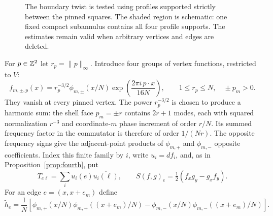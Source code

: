 \begin{figure}[htbp]
\centering
{}
\caption{The boundary twist is tested using profiles supported strictly
between the pinned squares.  The shaded region is schematic: one fixed
compact subannulus contains all four profile supports.  The estimates
remain valid when arbitrary vertices and edges are deleted.}
\label{fig:annulus-tests}
\end{figure}

For $p\in\mathbb Z^2$ let $r_p=\|p\|_\infty$.  Introduce four groups of
vertex functions, restricted to $V$:
\begin{equation}\label{eq:annulus-modes}
 f_{m,\pm,p}(x)
 =r_p^{-3/2}\phi_{m,\pm}(x/N)
       \exp\left(\frac{2\pi i\,p\cdot x}{16N}\right),
 \qquad
 1\leq r_p\leq N,\quad \pm p_m>0.
\end{equation}
They vanish at every pinned vertex.  The power $r_p^{-3/2}$ is chosen
to produce a harmonic sum: the shell face $p_m=\pm r$ contains $2r+1$ modes, each with
squared normalization $r^{-3}$ and coordinate-$m$ phase increment of order
$r/N$.  Its summed frequency factor in the commutator is therefore of
order $1/(Nr)$.  The opposite frequency signs give the adjacent-point
products of $\phi_{m,+}$ and $\phi_{m,-}$ opposite coefficients.
Index this finite family by $i$, write $u_i=df_i$, and, as in
Proposition~\ref{prop:fourth}, put
\[
 T_{e\ell}=\sum_i u_i(e)\overline{u_i(\ell)},
 \qquad
 S(f,g)_e=\tfrac12(f_xg_y-g_xf_y).
\]
For an edge $e=(x,x+e_m)$ define
\begin{equation}\label{eq:annulus-htilde}
 \widetilde h_e=\frac1N
 \left[
 \phi_{m,+}(x/N)\phi_{m,+}((x+e_m)/N)
 -\phi_{m,-}(x/N)\phi_{m,-}((x+e_m)/N)
 \right].
\end{equation}

